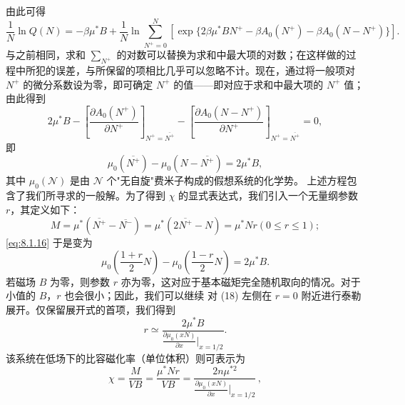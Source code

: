 由此可得
\begin{equation}\tag{8.1.52}\label{eq:8.1.52}
\frac { 1 } { N } \ln Q ( N ) = - \beta \mu ^{*} B + \frac { 1 } { N } \ln \sum _ { N ^{+} = 0 } ^{N} [ \exp \{ 2 \beta \mu ^{*} B N ^{+} - \beta A _ { 0 } ( N ^{+} ) - \beta A _ { 0 } ( N - N ^{+} ) \} ] .
\end{equation}
与之前相同，求和 \(\sum_{N^{+}}\) 的对数可以替换为求和中最大项的对数；在这样做的过程中所犯的误差，与所保留的项相比几乎可以忽略不计。现在，通过将一般项对 \(N^{+}\) 的微分系数设为零，即可确定 \(N^{+}\) 的值——即对应于求和中最大项的 \(N^{+}\) 值；由此得到
\begin{equation}\tag{8.1.53}\label{eq:8.1.53}
2 \mu ^{*} B - \left[ \frac { \partial A _ { 0 } ( N ^{+} ) } { \partial N ^{+} } \right] _ { N ^{+} = \overline { { N ^{+} } } } - \left[ \frac { \partial A _ { 0 } ( N - N ^{+} ) } { \partial N ^{+} } \right] _ { N ^{+} = \overline { { N ^{+} } } } = 0 ,
\end{equation}
即
\begin{equation}\tag{8.1.54}\label{eq:8.1.54}
\mu _ { 0 } ( \overline { { N ^{+} } } ) - \mu _ { 0 } ( N - \overline { { N ^{+} } } ) = 2 \mu ^{*} B ,
\end{equation}
其中 \(\mu_{0}(\mathcal{N})\) 是由 \(\mathcal{N}\) 个"无自旋"费米子构成的假想系统的化学势。
上述方程包含了我们所寻求的一般解。为了得到 \(\chi\) 的显式表达式，我们引入一个无量纲参数 \(r\)，其定义如下：
\begin{equation}\tag{8.1.55}\label{eq:8.1.55}
M = \mu ^{*} ( \overline { { N ^{+} } } - \overline { { N ^{-} } } ) = \mu ^{*} ( 2 \overline { { N ^{+} } } - N ) = \mu ^{*} N r  ( 0 \leq r \leq 1 ) ;
\end{equation}
\autoref{eq:8.1.16} 于是变为
\begin{equation}\tag{8.1.56}\label{eq:8.1.56}
\mu _ { 0 } \left( \frac { 1 + r } { 2 } N \right) - \mu _ { 0 } \left( \frac { 1 - r } { 2 } N \right) = 2 \mu ^{*} B .
\end{equation}
若磁场 \(B\) 为零，则参数 \(r\) 亦为零，这对应于基本磁矩完全随机取向的情况。对于小值的 \(B\)，\(r\) 也会很小；因此，我们可以继续
对 (18) 左侧在 \(r=0\) 附近进行泰勒展开。仅保留展开式的首项，我们得到
\begin{equation}\tag{8.1.57}\label{eq:8.1.57}
r \simeq \frac { 2 \mu ^{*} B } { \frac { \partial \mu _ { 0 } ( x N ) } { \partial x } \bigg | _ { x = 1 / 2 } } .
\end{equation}
该系统在低场下的比容磁化率（单位体积）则可表示为
\begin{equation}\tag{8.1.58}\label{eq:8.1.58}
\chi = \frac { M } { V B } = \frac { \mu ^{*} N r } { V B } = \frac { 2 n \mu ^{* 2} } { \frac { \partial \mu _ { 0 } ( x N ) } { \partial x } \big | _ { x = 1 / 2 } } \, ,
\end{equation}
